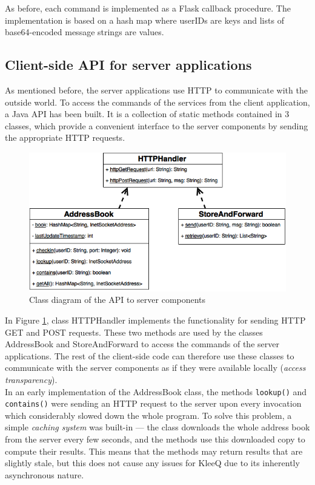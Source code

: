 \documentclass[a4paper, twoside, 12pt]{report}
\begin{document}
As before, each command is implemented as a Flask callback procedure. The implementation is based on a hash map where userIDs are keys and lists of base64-encoded message strings are values.


\subsection{Client-side API for server applications}
\label{subsec:impl.prep.API}
As mentioned before, the server applications use HTTP to communicate with the outside world. To access the commands of the services from the client application, a Java API has been built. It is a collection of static methods contained in 3 classes, which provide a convenient interface to the server components by sending the appropriate HTTP requests.

\begin{figure}[H]
    \centering
    \includegraphics[width = 0.8 \linewidth]{pics/scaffolding_uml.png}
    \caption{\label{fig:scaffolding_uml} Class diagram of the API to server components}
\end{figure}
In Figure \ref{fig:scaffolding_uml}, class HTTPHandler implements the functionality for sending HTTP GET and POST requests. These two methods are used by the classes AddressBook and StoreAndForward to access the commands of the server applications. The rest of the client-side code can therefore use these classes to communicate with the server components as if they were available locally (\emph{access transparency}). \\

In an early implementation of the AddressBook class, the methods \texttt{lookup()} and \texttt{contains()} were sending an HTTP request to the server upon every invocation which considerably slowed down the whole program. To solve this problem, a simple \emph{caching system} was built-in --- the class downloads the whole address book from the server every few seconds, and the methods use this downloaded copy to compute their results. This means that the methods may return results that are slightly stale, but this does not cause any issues for KleeQ due to its inherently asynchronous nature. \\
\end{document}
